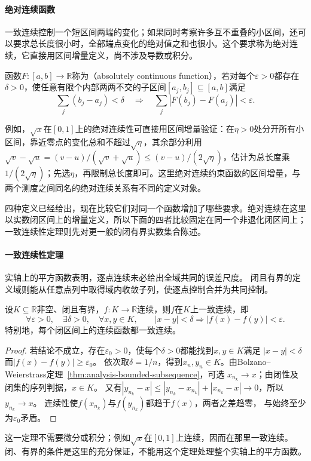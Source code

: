 \paragraph{绝对连续函数}
一致连续控制一个短区间两端的变化；如果同时考察许多互不重叠的小区间，还可以要求总长度很小时，全部端点变化的绝对值之和也很小。这个要求称为绝对连续，它直接用区间增量定义，尚不涉及导数或积分。
\begin{definition}[绝对连续函数]
\label{def:measurable-absolutely-continuous-function}
函数$F:[a,b]\to\mathbb R$称为（absolutely continuous function），若对每个$\varepsilon>0$都存在$\delta>0$，使任意有限个内部两两不交的子区间$[a_j,b_j]\subseteq[a,b]$满足
\[
 \sum_j(b_j-a_j)<\delta
 \quad\Longrightarrow\quad
 \sum_j|F(b_j)-F(a_j)|<\varepsilon.
\]
\end{definition}
例如，$\sqrt x$在$[0,1]$上的绝对连续性可直接用区间增量验证：在$\eta>0$处分开所有小区间，靠近零点的变化总和不超过$\sqrt\eta$，其余部分利用$\sqrt v-\sqrt u=(v-u)/(\sqrt v+\sqrt u)\leq(v-u)/(2\sqrt\eta)$，估计为总长度乘$1/(2\sqrt\eta)$；先选$\eta$，再限制总长度即可。这里绝对连续约束函数的区间增量，与两个测度之间同名的绝对连续关系有不同的定义对象。

四种定义已经给出，现在比较它们对同一个函数增加了哪些要求。绝对连续在这里以实数闭区间上的增量定义，所以下面的四者比较固定在同一个非退化闭区间上；一致连续性定理则先对更一般的闭有界实数集合陈述。

\paragraph{一致连续性定理}
实轴上的平方函数表明，逐点连续未必给出全域共同的误差尺度。
闭且有界的定义域则能从任意点列中取得域内收敛子列，使逐点控制合并为共同控制。
\begin{theorem}[闭有界集上的一致连续性]
\label{thm:analysis-uniform-continuity}
设$K\subseteq\mathbb R$非空、闭且有界，$f:K\to\mathbb R$连续，则$f$在$K$上一致连续，即
\[
 \forall\varepsilon>0,\quad\exists\delta>0,\quad\forall x,y\in K,\qquad
 |x-y|<\delta\Longrightarrow |f(x)-f(y)|<\varepsilon.
\]
特别地，每个闭区间上的连续函数都一致连续。
\end{theorem}
\begin{proof}
若结论不成立，存在$\varepsilon_0>0$，使每个$\delta>0$都能找到$x,y\in K$满足
$|x-y|<\delta$而$|f(x)-f(y)|\geq\varepsilon_0$。
依次取$\delta=1/n$，得到$x_n,y_n\in K$。由Bolzano--Weierstrass定理~\ref{thm:analysis-bounded-subsequence}，可选
$x_{n_k}\to x$；由闭性及闭集的序列判据，$x\in K$。
又有$|y_{n_k}-x|\leq|y_{n_k}-x_{n_k}|+|x_{n_k}-x|\to0$，所以$y_{n_k}\to x$。
连续性使$f(x_{n_k})$与$f(y_{n_k})$都趋于$f(x)$，两者之差趋零，
与始终至少为$\varepsilon_0$矛盾。
\end{proof}
这一定理不需要微分或积分；例如$\sqrt x$在$[0,1]$上连续，因而在那里一致连续。
闭、有界的条件是这里的充分保证，不能用这个定理处理整个实轴上的平方函数。

